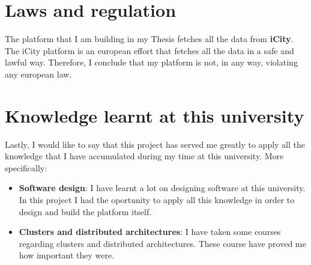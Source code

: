 \documentclass[a4paper,12pt]{article}
\newcommand{\mylist}{
\begin{itemize}
\setlength{\itemsep}{1pt}
\setlength{\parskip}{0pt}
\setlength{\parsep}{0pt}}
\newcommand{\mylistend}{\end{itemize}}
\begin{document}
\section{Laws and regulation}

The platform that I am building in my Thesis fetches all the data from {\bf
iCity}. The iCity platform is an european effort that fetches all the data in a
safe and lawful way. Therefore, I conclude that my platform is not, in any way,
violating any european law.

\section{Knowledge learnt at this university}

Lastly, I would like to say that this project has served me greatly to apply
all the knowledge that I have accumulated during my time at this university.
More specifically:

\mylist
  \item {\bf Software design}: I have learnt a lot on designing software at this
university. In this project I had the oportunity to apply all this knowledge in
order to design and build the platform itself.
  \item {\bf Clusters and distributed architectures}: I have taken some courses
regarding clusters and distributed architectures. These course have proved me
how important they were.
\mylistend
\end{document}
